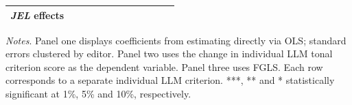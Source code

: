 \begin{table}
\begin{threeparttable}
\begin{tabular}{p{4.5cm}S@{}S@{}S@{}S@{}S@{}S@{}S@{}S@{}S@{}S@{}S@{}}
            \textit{JEL} effects          &               &           {}   &               &           {}   &               &           {}   &               &           {}   &               &               &               \\
            \bottomrule
        \end{tabular}
        \begin{tablenotes}
            \tiny
            \item \textit{Notes}. Panel one displays coefficients from estimating directly via OLS; standard errors clustered by editor. Panel two uses the change in individual LLM tonal criterion score as the dependent variable. Panel three uses FGLS. Each row corresponds to a separate individual LLM criterion. ***, ** and * statistically significant at 1\%, 5\% and 10\%, respectively.
        \end{tablenotes}
    \end{threeparttable}

\end{table}
